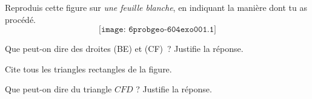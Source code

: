 \begin{myenumerate}
\item Reproduis cette figure sur {\em une feuille blanche}, en indiquant la manière dont tu as procédé.
\[\texttt{[image: 6probgeo-604exo001.1]}\]
\item Que peut-on dire des droites (BE) et (CF) ? Justifie la réponse.
\item Cite tous les triangles rectangles de la figure.
\item Que peut-on dire du triangle $CFD$ ? Justifie la réponse.
\end{myenumerate}